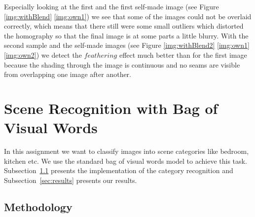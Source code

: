 \documentclass[subfigure,epsfig,fleqn,float,numbers=noenddot]{scrartcl}
\begin{document}
Especially looking at the first and the first self-made image (see Figure \ref{img:withBlend} \ref{img:own1}) we see that some of the images could not be overlaid correctly, which means that there still were some small outliers which distorted the homography so that the final image is at some parts a little blurry. 
With the second sample and the self-made images (see Figure \ref{img:withBlend2} \ref{img:own1} \ref{img:own2}) we detect the $feathering$ effect much better than for the first image because the shading through the image is continuous and no seams are visible from overlapping one image after another. 


\section{Scene Recognition with Bag of Visual Words}
\label{sec:2}

In this assignment we want to classify images into scene categories like bedroom, kitchen etc. 
We use the standard bag of visual words model to achieve this task. Subsection~\ref{sec:methodology} presents the implementation of the category recognition and Subsection~\ref{sec:results} presents our results.

\subsection{Methodology}
\label{sec:methodology}
\end{document}
